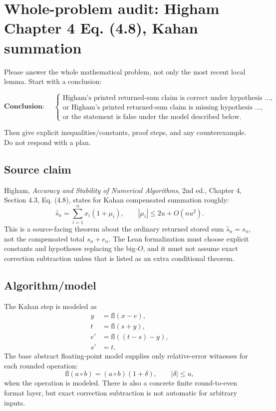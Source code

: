 \documentclass{article}
\begin{document}
\section*{Whole-problem audit: Higham Chapter 4 Eq. (4.8), Kahan summation}

Please answer the whole mathematical problem, not only the most recent local
lemma.  Start with a conclusion:

\[
\textbf{Conclusion: }\quad
\begin{cases}
\text{Higham's printed returned-sum claim is correct under hypothesis ...},\\
\text{or Higham's printed returned-sum claim is missing hypothesis ...},\\
\text{or the statement is false under the model described below.}
\end{cases}
\]

Then give explicit inequalities/constants, proof steps, and any counterexample.
Do not respond with a plan.

\subsection*{Source claim}

Higham, \emph{Accuracy and Stability of Numerical Algorithms}, 2nd ed.,
Chapter 4, Section 4.3, Eq. (4.8), states for Kahan compensated summation
roughly:
\[
  \widehat s_n=\sum_{i=1}^n x_i(1+\mu_i),\qquad
  |\mu_i|\le 2u+O(nu^2).
\]
This is a source-facing theorem about the ordinary returned stored sum
\(\widehat s_n=s_n\), not the compensated total \(s_n+e_n\).  The Lean
formalization must choose explicit constants and hypotheses replacing the
big-\(O\), and it must not assume exact correction subtraction unless that is
listed as an extra conditional theorem.

\subsection*{Algorithm/model}

The Kahan step is modeled as
\[
\begin{aligned}
  y &= \mathrm{fl}(x-e),\\
  t &= \mathrm{fl}(s+y),\\
  e'&= \mathrm{fl}((t-s)-y),\\
  s'&=t.
\end{aligned}
\]
The base abstract floating-point model supplies only relative-error witnesses
for each rounded operation:
\[
  \mathrm{fl}(a\circ b)=(a\circ b)(1+\delta),\qquad |\delta|\le u,
\]
when the operation is modeled.  There is also a concrete finite round-to-even
format layer, but exact correction subtraction is not automatic for arbitrary
inputs.
\end{document}
